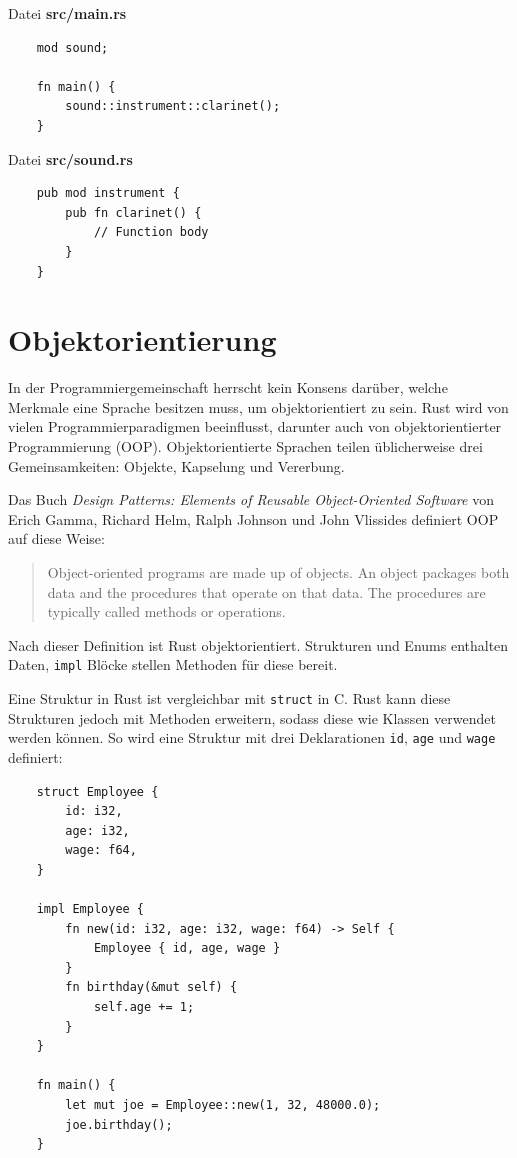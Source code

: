 \vspace{0.5cm}

\noindent Datei \textbf{src/main.rs}

\begin{lstlisting}
    mod sound;

    fn main() {
        sound::instrument::clarinet();
    }
\end{lstlisting}

\vspace{0.5cm}

\noindent Datei \textbf{src/sound.rs}

\begin{lstlisting}
    pub mod instrument {
        pub fn clarinet() {
            // Function body
        }
    }
\end{lstlisting}


\section{Objektorientierung}\label{chap:oop}

In der Programmiergemeinschaft herrscht kein Konsens darüber, welche Merkmale eine Sprache besitzen muss, um objektorientiert zu sein. Rust wird von vielen Programmierparadigmen beeinflusst, darunter auch von objektorientierter Programmierung (OOP). Objektorientierte Sprachen teilen üblicherweise drei Gemeinsamkeiten: Objekte, Kapselung und Vererbung.

Das Buch \textit{Design Patterns: Elements of Reusable Object-Oriented Software} von Erich Gamma, Richard Helm, Ralph Johnson und John Vlissides definiert OOP auf diese Weise:

\begin{quote}
    Object-oriented programs are made up of objects. An object packages both data and the procedures that operate on that data. The procedures are typically called methods or operations.
\end{quote}

Nach dieser Definition ist Rust objektorientiert. Strukturen und Enums enthalten Daten, \verb"impl" Blöcke stellen Methoden für diese bereit.

Eine Struktur in Rust ist vergleichbar mit \verb"struct" in C. Rust kann diese Strukturen jedoch mit Methoden erweitern, sodass diese wie Klassen verwendet werden können. So wird eine Struktur mit drei Deklarationen \verb"id", \verb"age" und \verb"wage" definiert:

\begin{lstlisting}
    struct Employee {
        id: i32,
        age: i32,
        wage: f64,
    }
    
    impl Employee {
        fn new(id: i32, age: i32, wage: f64) -> Self {
            Employee { id, age, wage }
        }
        fn birthday(&mut self) {
            self.age += 1;
        }
    }
    
    fn main() {
        let mut joe = Employee::new(1, 32, 48000.0);
        joe.birthday();
    }
\end{lstlisting}


